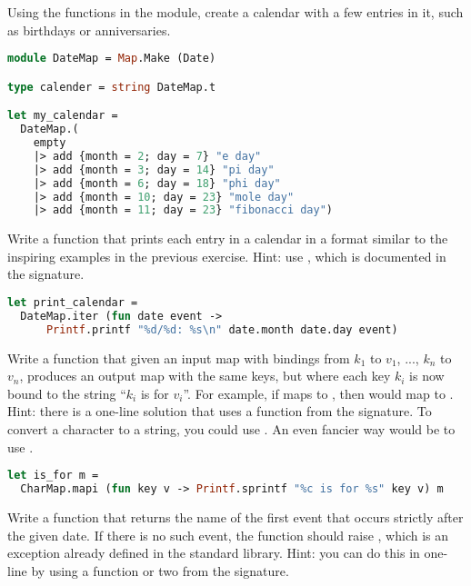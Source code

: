 Using the functions in the  module, create a calendar with a few entries in it, such as birthdays or anniversaries.

\begin{lstlisting}[language=OCaml]
module DateMap = Map.Make (Date)

type calender = string DateMap.t

let my_calendar =
  DateMap.(
    empty
    |> add {month = 2; day = 7} "e day"
    |> add {month = 3; day = 14} "pi day"
    |> add {month = 6; day = 18} "phi day"
    |> add {month = 10; day = 23} "mole day"
    |> add {month = 11; day = 23} "fibonacci day")
\end{lstlisting}

Write a function  that prints each entry in a calendar in a format similar to the inspiring examples in the previous exercise. Hint: use , which is documented in the  signature.

\begin{lstlisting}[language=OCaml]
let print_calendar =
  DateMap.iter (fun date event ->
      Printf.printf "%d/%d: %s\n" date.month date.day event)
\end{lstlisting}

\problem[is for]
Write a function  that given an input map with bindings from $k_1$ to $v_1$, ..., $k_n$ to $v_n$, produces an output map with the same keys, but where each key $k_i$ is now bound to the string ``$k_i$ is for $v_i$''. For example, if  maps  to , then  would map  to . Hint: there is a one-line solution that uses a function from the  signature. To convert a character to a string, you could use . An even fancier way would be to use .

\begin{lstlisting}[language=OCaml]
let is_for m =
  CharMap.mapi (fun key v -> Printf.sprintf "%c is for %s" key v) m
\end{lstlisting}

Write a function  that returns the name of the first event that occurs strictly after the given date. If there is no such event, the function should raise , which is an exception already defined in the standard library. Hint: you can do this in one-line by using a function or two from the  signature.

